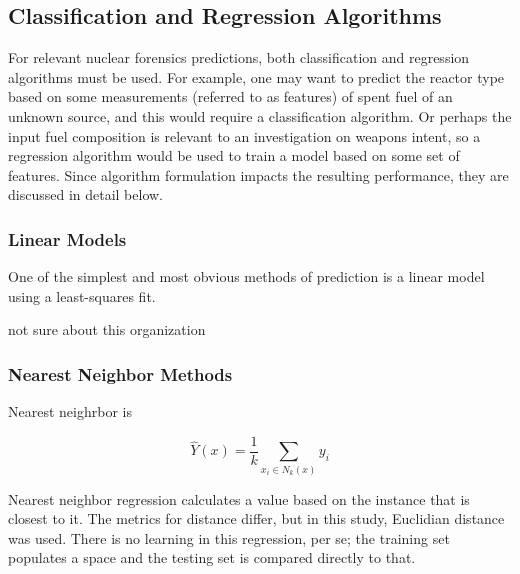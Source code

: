 \subsection{Classification and Regression Algorithms}
\label{sec:algs}

For relevant nuclear forensics predictions, both classification and regression
algorithms must be used.  For example, one may want to predict the reactor type
based on some measurements (referred to as features) of spent fuel of an
unknown source, and this would require a classification algorithm. Or perhaps
the input fuel composition is relevant to an investigation on weapons intent,
so a regression algorithm would be used to train a model based on some set of
features.  Since algorithm formulation impacts the resulting performance, they
are discussed in detail below.  


\subsubsection{Linear Models}
\label{sec:linear}

One of the simplest and most obvious methods of prediction is a linear model
using a least-squares fit. 





not sure about this organization

\subsubsection{Nearest Neighbor Methods}
\label{sec:neighbor}

Nearest neighrbor is 



\begin{equation}
\hat{Y}(x) = \frac{1}{k} \sum_{x_i \in N_k(x)} y_i
\end{equation}

Nearest neighbor regression calculates a value based on the instance that is
closest to it. The metrics for distance differ, but in this study, Euclidian
distance was used. There is no learning in this regression, per se; the
training set populates a space and the testing set is compared directly to
that. \cite{elements_stats} 


